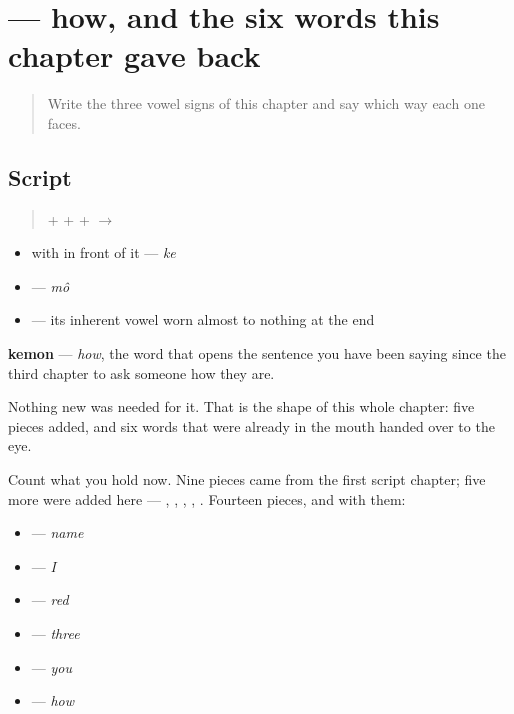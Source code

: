 \section[kemon]{ — how, and the six words this chapter gave back}

\label{lesson:BN-W02-kemon-read}



\begin{quote}
Write the three vowel signs of this chapter and say which way each one faces.
\end{quote}

\subsection*{Script}
\begin{quote}
\textbf{} + \textbf{} + \textbf{} + \textbf{} $\to$ \textbf{}
\end{quote}

\begin{itemize}
\raggedright
  \item \textbf{} with \textbf{} in front of it — \emph{ke}
  \item \textbf{} — \emph{mô}
  \item \textbf{} — its inherent vowel worn almost to nothing at the end
\end{itemize}

\textbf{kemon} — \emph{how}, the word that opens the sentence you have been saying since the third chapter to ask someone how they are.

Nothing new was needed for it. That is the shape of this whole chapter: five pieces added, and six words that were already in the mouth handed over to the eye.

Count what you hold now. Nine pieces came from the first script chapter; five more were added here — \textbf{}, \textbf{}, \textbf{}, \textbf{}, \textbf{}. Fourteen pieces, and with them:

\begin{itemize}
\raggedright
  \item \textbf{} — \emph{name}
  \item \textbf{} — \emph{I}
  \item \textbf{} — \emph{red}
  \item \textbf{} — \emph{three}
  \item \textbf{} — \emph{you}
  \item \textbf{} — \emph{how}
\end{itemize}

